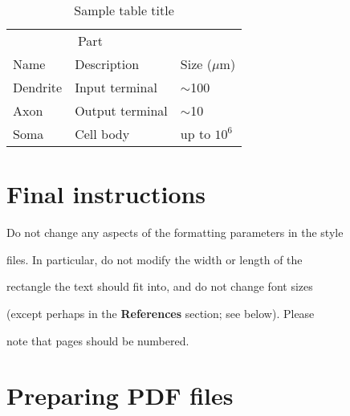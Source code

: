 \documentclass{article}
\begin{document}
\begin{table}

  \caption{Sample table title}

  \label{sample-table}

  \centering

  \begin{tabular}{lll}

    \toprule

    \multicolumn{2}{c}{Part}                   \\

    \cmidrule(r){1-2}

    Name     & Description     & Size ($\mu$m) \\

    \midrule

    Dendrite & Input terminal  & $\sim$100     \\

    Axon     & Output terminal & $\sim$10      \\

    Soma     & Cell body       & up to $10^6$  \\

    \bottomrule

  \end{tabular}

\end{table}



\section{Final instructions}



Do not change any aspects of the formatting parameters in the style

files.  In particular, do not modify the width or length of the

rectangle the text should fit into, and do not change font sizes

(except perhaps in the \textbf{References} section; see below). Please

note that pages should be numbered.



\section{Preparing PDF files}
\end{document}
